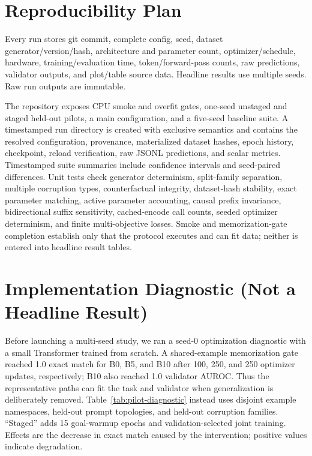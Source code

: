 \documentclass[11pt]{article}
\begin{document}
\section{Reproducibility Plan}
Every run stores git commit, complete config, seed, dataset generator/version/hash, architecture and parameter count, optimizer/schedule, hardware, training/evaluation time, token/forward-pass counts, raw predictions, validator outputs, and plot/table source data. Headline results use multiple seeds. Raw run outputs are immutable.

The repository exposes CPU smoke and overfit gates, one-seed unstaged and staged held-out pilots, a main configuration, and a five-seed baseline suite. A timestamped run directory is created with exclusive semantics and contains the resolved configuration, provenance, materialized dataset hashes, epoch history, checkpoint, reload verification, raw JSONL predictions, and scalar metrics. Timestamped suite summaries include confidence intervals and seed-paired differences. Unit tests check generator determinism, split-family separation, multiple corruption types, counterfactual integrity, dataset-hash stability, exact parameter matching, active parameter accounting, causal prefix invariance, bidirectional suffix sensitivity, cached-encode call counts, seeded optimizer determinism, and finite multi-objective losses. Smoke and memorization-gate completion establish only that the protocol executes and can fit data; neither is entered into headline result tables.

\section{Implementation Diagnostic (Not a Headline Result)}
Before launching a multi-seed study, we ran a seed-0 optimization diagnostic with a small Transformer trained from scratch. A shared-example memorization gate reached 1.0 exact match for B0, B5, and B10 after 100, 250, and 250 optimizer updates, respectively; B10 also reached 1.0 validator AUROC. Thus the representative paths can fit the task and validator when generalization is deliberately removed. Table~\ref{tab:pilot-diagnostic} instead uses disjoint example namespaces, held-out prompt topologies, and held-out corruption families. ``Staged'' adds 15 goal-warmup epochs and validation-selected joint training. Effects are the decrease in exact match caused by the intervention; positive values indicate degradation.
\end{document}
